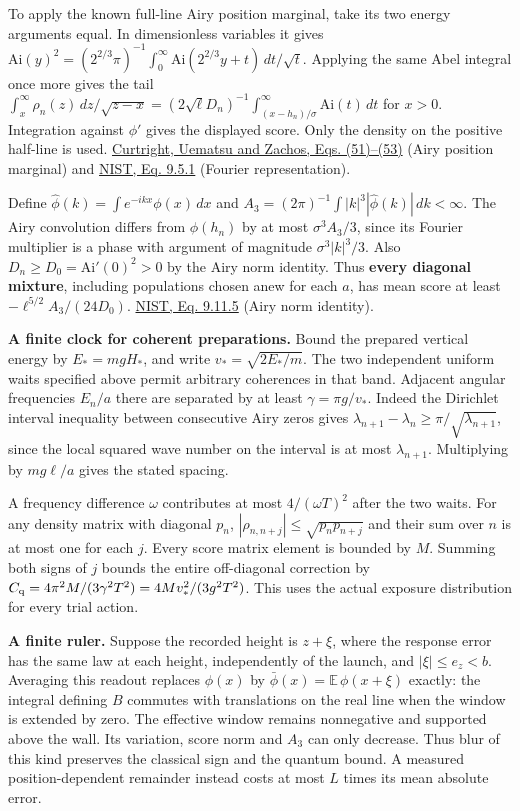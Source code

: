 \documentclass[11pt,a4paper]{article}
\begin{document}
To apply the known full-line Airy position marginal, take its two energy
arguments equal. In dimensionless variables it gives
\(\mathrm{Ai}(y)^2=(2^{2/3}\pi)^{-1}\int_0^\infty
\mathrm{Ai}(2^{2/3}y+t)\,dt/\sqrt t\). Applying the same Abel integral
once more gives the tail \(\int_x^\infty\rho_n(z)\,dz/\sqrt{z-x}
 =(2\sqrt\ell D_n)^{-1}\int_{(x-h_n)/\sigma}^\infty\mathrm{Ai}(t)\,dt\)
for \(x>0\). Integration against \(\phi'\) gives the displayed score.
Only the density on the positive half-line is used.
\href{https://arxiv.org/pdf/hep-th/0011137}{Curtright, Uematsu and
Zachos, Eqs. (51)--(53)} (Airy position marginal) and
\href{https://dlmf.nist.gov/9.5.E1}{NIST, Eq. 9.5.1} (Fourier
representation).

Define \(\widehat\phi(k)=\int e^{-ikx}\phi(x)\,dx\) and
\(A_3=(2\pi)^{-1}\int |k|^3|\widehat\phi(k)|\,dk<\infty\). The Airy
convolution differs from \(\phi(h_n)\) by at most \(\sigma^3 A_3/3\),
since its Fourier multiplier is a phase with argument of magnitude
\(\sigma^3|k|^3/3\). Also \(D_n\ge D_0=\mathrm{Ai}'(0)^2>0\) by the Airy
norm identity. Thus \textbf{every diagonal mixture}, including
populations chosen anew for each \(a\), has mean score at least
\(-\ell^{5/2}A_3/(24D_0)\). \href{https://dlmf.nist.gov/9.11.E5}{NIST,
Eq. 9.11.5} (Airy norm identity).

\textbf{A finite clock for coherent preparations.} Bound the prepared
vertical energy by \(E_*=mgH_*\), and write \(v_*=\sqrt{2E_*/m}\). The
two independent uniform waits specified above permit arbitrary
coherences in that band. Adjacent angular frequencies \(E_n/a\) there
are separated by at least \(\gamma=\pi g/v_*\). Indeed the Dirichlet
interval inequality between consecutive Airy zeros gives
\(\lambda_{n+1}-\lambda_n\ge\pi/\sqrt{\lambda_{n+1}}\), since the local
squared wave number on the interval is at most \(\lambda_{n+1}\).
Multiplying by \(mg\ell/a\) gives the stated spacing.

A frequency difference \(\omega\) contributes at most \(4/(\omega T)^2\)
after the two waits. For any density matrix with diagonal \(p_n\),
\(|\rho_{n,n+j}|\le\sqrt{p_n p_{n+j}}\) and their sum over \(n\) is at
most one for each \(j\). Every score matrix element is bounded by \(M\).
Summing both signs of \(j\) bounds the entire off-diagonal correction by
\(C_{\rm q}=4\pi^2 M/(3\gamma^2 T^2)=4M v_*^2/(3g^2T^2)\). This uses the
actual exposure distribution for every trial action.

\textbf{A finite ruler.} Suppose the recorded height is \(z+\xi\), where
the response error has the same law at each height, independently of the
launch, and \(|\xi|\le e_z<b\). Averaging this readout replaces
\(\phi(x)\) by \(\bar\phi(x)=\mathbb E\,\phi(x+\xi)\) exactly: the
integral defining \(B\) commutes with translations on the real line when
the window is extended by zero. The effective window remains nonnegative
and supported above the wall. Its variation, score norm and \(A_3\) can
only decrease. Thus blur of this kind preserves the classical sign and
the quantum bound. A measured position-dependent remainder instead costs
at most \(L\) times its mean absolute error.
\end{document}
